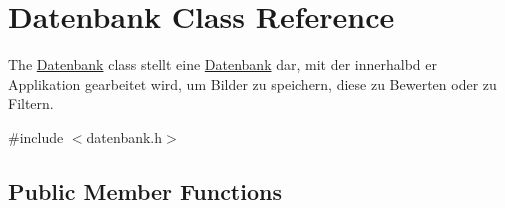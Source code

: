 \hypertarget{class_datenbank}{}\section{Datenbank Class Reference}
\label{class_datenbank}


The \hyperlink{class_datenbank}{Datenbank} class stellt eine \hyperlink{class_datenbank}{Datenbank} dar, mit der innerhalbd er Applikation gearbeitet wird, um Bilder zu speichern, diese zu Bewerten oder zu Filtern.  




{\ttfamily \#include $<$datenbank.\+h$>$}

\subsection*{Public Member Functions}
